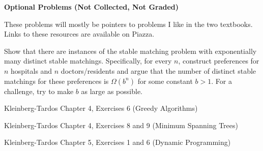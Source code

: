 \documentclass[11pt]{article}
\theoremstyle{definition}
\begin{document}
\noindent\textbf{\color{red} \Large Optional Problems (Not Collected, Not Graded)}

\medskip
\noindent These problems will mostly be pointers to problems I like in the two textbooks.  Links to these resources are available on Piazza.

\begin{enumerate}[leftmargin=0pt, itemsep=3ex]
\problemitem Show that there are instances of the stable matching problem with exponentially many distinct stable matchings.  Specifically, for every $n$, construct preferences for $n$ hospitals and $n$ doctors/residents and argue that the number of distinct stable matchings for these preferences is $\Omega(b^n)$ for some constant $b > 1$.  For a challenge, try to make $b$ as large as possible.

\problemitem Kleinberg-Tardos Chapter 4, Exercises 6 (Greedy Algorithms)

\problemitem Kleinberg-Tardos Chapter 4, Exercises 8 and 9 (Minimum Spanning Trees)

\problemitem Kleinberg-Tardos Chapter 5, Exercises 1 and 6 (Dynamic Programming)
\end{enumerate}
\end{document}
